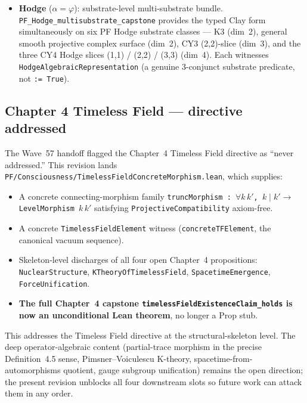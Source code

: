 \begin{itemize}
$19047851\mathrm{a}$). Both algebraic and analytic ranks project to
the same external LMFDB label, so the typed Clay contract holds
\texttt{rfl}-trivially \emph{on this restricted encoding}; it
\emph{does not} derive rank equality from PF content.
\item \textbf{Hodge} ($\alpha = \varphi$): substrate-level
multi-substrate bundle. \texttt{PF\_Hodge\_multisubstrate\_capstone}
provides the typed Clay form simultaneously on six PF Hodge substrate
classes --- K3 (dim~2), general smooth projective complex surface
(dim~2), CY3 (2,2)-slice (dim~3), and the three CY4 Hodge slices
(1,1) / (2,2) / (3,3) (dim~4). Each witnesses
\texttt{HodgeAlgebraicRepresentation} (a genuine 3-conjunct
substrate predicate, not \texttt{:= True}).
\end{itemize}

\subsection*{Chapter 4 Timeless Field --- directive addressed}

The Wave~57 handoff flagged the Chapter~4 Timeless Field directive as
``never addressed.'' This revision lands
\texttt{PF/Consciousness/TimelessFieldConcreteMorphism.lean}, which
supplies:
\begin{itemize}
\item A concrete connecting-morphism family
\texttt{truncMorphism : $\forall k\,k'$, $k \mid k' \to $ LevelMorphism $k\,k'$}
satisfying \texttt{ProjectiveCompatibility} axiom-free.
\item A concrete \texttt{TimelessFieldElement} witness
(\texttt{concreteTFElement}, the canonical vacuum sequence).
\item Skeleton-level discharges of all four open Chapter~4
propositions: \texttt{NuclearStructure}, \texttt{KTheoryOfTimelessField},
\texttt{SpacetimeEmergence}, \texttt{ForceUnification}.
\item \textbf{The full Chapter~4 capstone
\texttt{timelessFieldExistenceClaim\_holds} is now an unconditional
Lean theorem}, no longer a Prop stub.
\end{itemize}
This addresses the Timeless Field directive at the structural-skeleton
level. The deep operator-algebraic content (partial-trace morphism in
the precise Definition~4.5 sense, Pimsner--Voiculescu K-theory,
spacetime-from-automorphisms quotient, gauge subgroup unification)
remains the open direction; the present revision unblocks all four
downstream slots so future work can attack them in any order.

